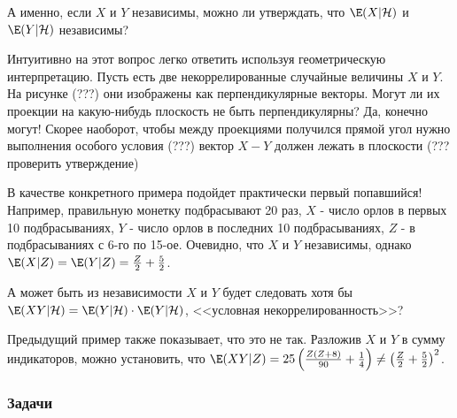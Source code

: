 {А именно, если $X$ и $Y$ независимы, можно ли утверждать, что $\E(X|\mathcal{H})$ и $\E(Y|\mathcal{H})$ независимы? 

Интуитивно на этот вопрос легко ответить используя геометрическую интерпретацию. Пусть есть две некоррелированные случайные величины $X$ и $Y$. На рисунке (???) они изображены как перпендикулярные векторы. Могут ли их проекции на какую-нибудь плоскость не быть перпендикулярны? Да, конечно могут! Скорее наоборот, чтобы между проекциями получился прямой угол нужно выполнения особого условия (???) вектор $X-Y$ должен лежать в плоскости (??? проверить утверждение)

В качестве конкретного примера подойдет практически первый попавшийся! Например, правильную монетку подбрасывают 20 раз, $X$ - число орлов в первых 10 подбрасываниях, $Y$ - число орлов в последних 10 подбрасываниях, $Z$ - в подбрасываниях с 6-го по 15-ое. Очевидно, что $X$ и $Y$ независимы, однако $\E(X|Z)=\E(Y|Z)=\frac{Z}{2}+\frac{5}{2}$.

А может быть из независимости $X$ и $Y$ будет следовать хотя бы $\E(XY|\mathcal{H})=\E(Y|\mathcal{H})\cdot \E(Y|\mathcal{H})$, <<условная некоррелированность>>? 

Предыдущий пример также показывает, что это не так. Разложив $X$ и $Y$ в сумму индикаторов, можно установить, что $\E(XY|Z)=25\left(\frac{Z(Z+8)}{90}+\frac{1}{4}\right)\neq \left(\frac{Z}{2}+\frac{5}{2}\right)^{2}$.







}
\subsubsection*{Задачи}










